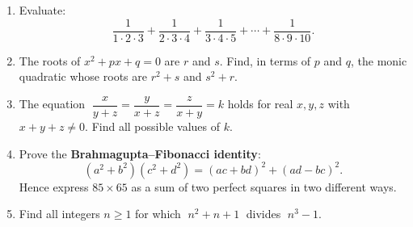 \documentclass[11pt,a4paper]{article}
\begin{document}
\begin{enumerate}

\item Evaluate:
\[
  \frac{1}{1\cdot2\cdot3}+\frac{1}{2\cdot3\cdot4}+\frac{1}{3\cdot4\cdot5}
    +\cdots+\frac{1}{8\cdot9\cdot10}.
\]

\item The roots of $x^2+px+q=0$ are $r$ and $s$.
      Find, in terms of $p$ and $q$, the monic quadratic whose roots are
      $r^2+s$ and $s^2+r$.

\item The equation $\;\dfrac{x}{y+z}=\dfrac{y}{x+z}=\dfrac{z}{x+y}=k$\;
      holds for real $x,y,z$ with $x+y+z\neq0$.
      Find all possible values of $k$.

\item Prove the \textbf{Brahmagupta--Fibonacci identity}:
\[
  (a^2+b^2)(c^2+d^2)=(ac+bd)^2+(ad-bc)^2.
\]
Hence express $85\times 65$ as a sum of two perfect squares in two different ways.

\item Find all integers $n\geq 1$ for which $\;n^2+n+1\;$ divides $\;n^3-1$.

\end{enumerate}

\end{document}
